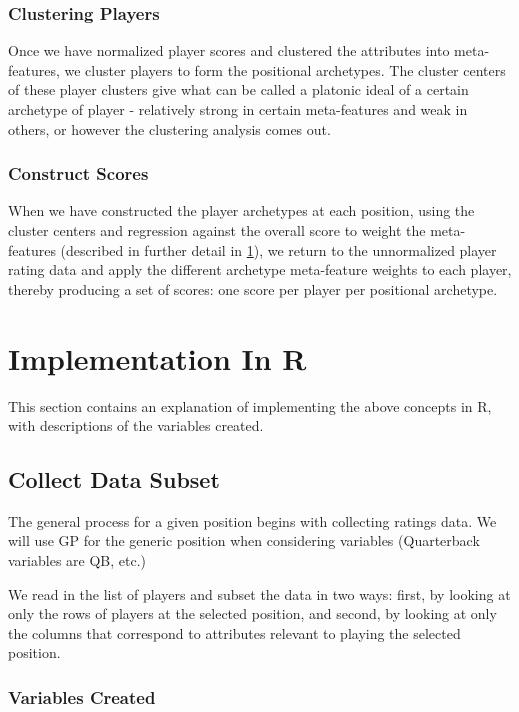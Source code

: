 \documentclass[11pt]{article}
\begin{document}
\subsubsection{Clustering Players}
Once we have normalized player scores and clustered the attributes into meta-features, we cluster players to form the positional archetypes. The cluster centers of these player clusters give what can be called a platonic ideal of a certain archetype of player - relatively strong in certain meta-features and weak in others, or however the clustering analysis comes out. 
\subsubsection{Construct Scores}
When we have constructed the player archetypes at each position, using the cluster centers and regression against the overall score to weight the meta-features (described in further detail in \ref{Implementation}), we return to the unnormalized player rating data and apply the different archetype meta-feature weights to each player, thereby producing a set of scores: one score per player per positional archetype.

\section{Implementation In R}
\label{Implementation}

This section contains an explanation of implementing the above concepts in R, with descriptions of the variables created.

\subsection{Collect Data Subset}

The general process for a given position begins with collecting ratings data. We will use GP for the generic position when considering variables (Quarterback variables are QB, etc.)

We read in the list of players and subset the data in two ways: first, by looking at only the rows of players at the selected position, and second, by looking at only the columns that correspond to attributes relevant to playing the selected position.


\subsubsection{Variables Created}
\end{document}

